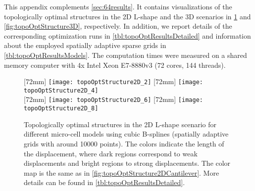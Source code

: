 \label{chap:a30topoOptDetails}

\noindent
This appendix complements \cref{sec:64results}.
It contains visualizations of the topologically optimal structures
in the 2D L-shape and the 3D scenarios in
\cref{fig:topoOptStructure2DLShape} and \cref{fig:topoOptStructure3D},
respectively.
In addition, we report details of the corresponding optimization runs
in \cref{tbl:topoOptResultsDetailed} and
information about the employed spatially adaptive sparse grids in
\cref{tbl:topoOptResultsModels}.
The computation times were measured on a shared memory computer
with 4x Intel Xeon E7-8880v3 (72 cores, 144 threads).

\begin{figure}
  [72mm]{%
    \texttt{[image: topoOptStructure2D\_2]}%
  }%
  \hfill%
  [72mm]{%
    \texttt{[image: topoOptStructure2D\_4]}%
  }%
  \\[2mm]%
  [72mm]{%
    \texttt{[image: topoOptStructure2D\_6]}%
  }%
  \hfill%
  [72mm]{%
    \texttt{[image: topoOptStructure2D\_8]}%
  }%
  \caption[Optimal structures in the 2D L-shape scenario]{%
    Topologically optimal structures in the 2D L-shape scenario
    for different micro-cell models using cubic B-splines
    (spatially adaptive grids with around \num{10000} points).
    The colors indicate the length of the displacement,
    where dark regions correspond to weak displacements and
    bright regions to strong displacements.
    The color map is the same as in
    \cref{fig:topoOptStructure2DCantilever}.
    More details can be found in \cref{tbl:topoOptResultsDetailed}.%
  }%
  \label{fig:topoOptStructure2DLShape}%
\end{figure}

